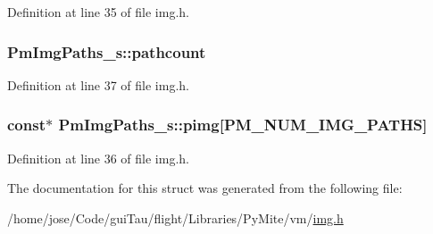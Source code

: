 Definition at line 35 of file img.\-h.

\hypertarget{struct_pm_img_paths__s_a84a34ed44ebcba636164d6935c111943}{
\subsubsection[{pathcount}]{ Pm\-Img\-Paths\-\_\-s\-::pathcount}}\label{struct_pm_img_paths__s_a84a34ed44ebcba636164d6935c111943}


Definition at line 37 of file img.\-h.

\hypertarget{struct_pm_img_paths__s_ac68b1647a12850e4034da1579c9f3d62}{
\subsubsection[{pimg}]{ {\bf const}$\ast$ Pm\-Img\-Paths\-\_\-s\-::pimg\mbox{[}P\-M\-\_\-\-N\-U\-M\-\_\-\-I\-M\-G\-\_\-\-P\-A\-T\-H\-S\mbox{]}}}\label{struct_pm_img_paths__s_ac68b1647a12850e4034da1579c9f3d62}


Definition at line 36 of file img.\-h.



The documentation for this struct was generated from the following file\-:\begin{DoxyCompactItemize}
\item 
/home/jose/\-Code/gui\-Tau/flight/\-Libraries/\-Py\-Mite/vm/\hyperlink{img_8h}{img.\-h}\end{DoxyCompactItemize}
